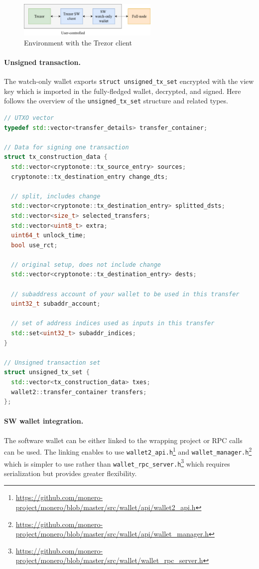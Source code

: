 \documentclass[]{article}
\begin{document}
\begin{figure}[H]
	\centering
	\includegraphics[width=0.6\textwidth, angle=0]{img/trezor-int.pdf}
	\caption{Environment with the Trezor client}
\end{figure}

\paragraph{Unsigned transaction.}
The watch-only wallet exports \verb|struct unsigned_tx_set| encrypted with the view key which is imported in the fully-fledged wallet, decrypted, and signed. Here follows the overview of the \verb|unsigned_tx_set| structure and related types.

\begin{lstlisting}[language=c++]
// UTXO vector
typedef std::vector<transfer_details> transfer_container;

// Data for signing one transaction
struct tx_construction_data {
  std::vector<cryptonote::tx_source_entry> sources;
  cryptonote::tx_destination_entry change_dts;
  
  // split, includes change
  std::vector<cryptonote::tx_destination_entry> splitted_dsts; 
  std::vector<size_t> selected_transfers;
  std::vector<uint8_t> extra;
  uint64_t unlock_time;
  bool use_rct;
  
  // original setup, does not include change
  std::vector<cryptonote::tx_destination_entry> dests; 
  
  // subaddress account of your wallet to be used in this transfer
  uint32_t subaddr_account;  
  
  // set of address indices used as inputs in this transfer
  std::set<uint32_t> subaddr_indices;  
}

// Unsigned transaction set
struct unsigned_tx_set {
  std::vector<tx_construction_data> txes;
  wallet2::transfer_container transfers;
};
\end{lstlisting}

\paragraph{SW wallet integration.} The software wallet can be either linked to the wrapping project or RPC calls can be used. The linking enables to use \verb|wallet2_api.h|\footnote{\url{https://github.com/monero-project/monero/blob/master/src/wallet/api/wallet2_api.h}} and \verb|wallet_manager.h|\footnote{\url{https://github.com/monero-project/monero/blob/master/src/wallet/api/wallet_manager.h}} which is simpler to use rather than \verb|wallet_rpc_server.h|\footnote{\url{https://github.com/monero-project/monero/blob/master/src/wallet/wallet_rpc_server.h}} which requires serialization but provides greater flexibility.
\end{document}
